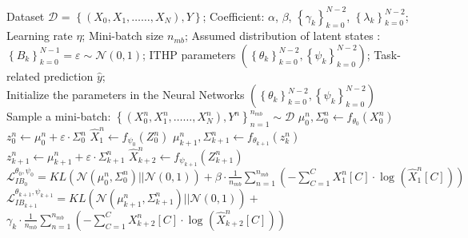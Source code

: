 \begin{algorithm}[htb]
    \caption{Pseudo-code for training ITHP in general scenario }
    \label{alg:algITHP}
    \begin{algorithmic}
      \Require Dataset $\mathcal{D}$ = $\left \{ \left ( X_{0}, X_{1},\dots \dots ,X_{N} \right ) ,Y \right \} $; Coefficient: $\alpha $, $\beta$, $\left \{ \gamma _{k}  \right \} _{k=0}^{N-2} $, $\left \{ \lambda _{k}  \right \} _{k=0}^{N-2} $; Learning rate $\eta$; Mini-batch size $n_{mb}$; Assumed distribution of latent states : $\left \{ B_{k}  \right \} _{k=0}^{N-1} = \varepsilon \sim \mathcal{N} \left ( 0,1 \right )$;
      \Ensure ITHP parameters $(\left \{ \theta _{k}  \right \} _{k=0}^{N-2} ,\left \{ \psi _{k}  \right \} _{k=0}^{N-2} )$; Task-related prediction $\hat{y}$;
      \\Initialize the parameters in the Neural Networks $(\left \{ \theta _{k}  \right \} _{k=0}^{N-2} ,\left \{ \psi _{k}  \right \} _{k=0}^{N-2} )$
    \Repeat
        \State Sample a mini-batch: $\left \{ \left ( X_{0}^{n} , X_{1}^{n},\dots \dots ,X_{N}^{n} \right ) ,Y^{n} \right \} _{n=1}^{n_{mb} }\sim \mathcal{D } $
      \State $\mu_{0}^{n} ,\Sigma_{0}^{n}\longleftarrow f_{\theta _{0} } \left ( X_{0}^{n} \right ) $
      \State $z_{0}^{n} \longleftarrow \mu _{0}^{n}+  \varepsilon \cdot \Sigma  _{0}^{n}$
      \State $\hat{X}_{1}^{n} \longleftarrow f_{\psi _{0}}\left (Z_{0}^{n}\right ) $
        \State $\mu_{k+1}^{n} ,\Sigma_{k+1}^{n}\longleftarrow f_{\theta _{k+1} } \left ( z_{k}^{n} \right ) $
        \State $z_{k+1}^{n} \longleftarrow \mu _{k+1}^{n}+  \varepsilon \cdot \Sigma  _{k+1}^{n}$
        \State $\hat{X}_{k+2}^{n} \longleftarrow f_{\psi _{k+1}}\left (Z_{k+1}^{n}\right ) $
      \EndFor
    \EndFor 
        \State $\mathcal{L} _{IB_{0} }^{\theta _{0},\psi _{0} } =KL\left ( \mathcal{N}\left ( \mu _{0}^{n} ,\Sigma _{0}^{n}  \right )|| \mathcal{N}\left ( 0,1  \right )  \right )+\beta \cdot \frac{1}{n_{mb} }\sum_{n=1}^{n_{mb}}\left ( -\sum_{C=1}^{C}X_{1}^{n} \left [ C \right ] \cdot \log_{}{\left ( \hat{X} _{1}^{n} \left [ C\right ] \right ) }\right )  $
            \State $\mathcal{L} _{IB_{k+1} }^{\theta _{k+1},\psi _{k+1} } =KL\left ( \mathcal{N}\left ( \mu _{k+1}^{n} ,\Sigma _{k+1}^{n}  \right )|| \mathcal{N}\left ( 0,1  \right )  \right )+$ 
            \State$\gamma_{k}  \cdot \frac{1}{n_{mb} }\sum_{n=1}^{n_{mb}}\left ( -\sum_{C=1}^{C}X_{k+2}^{n} \left [ C \right ] \cdot \log_{}{\left ( \hat{X} _{k+2}^{n} \left [ C\right ] \right ) }\right ) $

\end{algorithmic}
\end{algorithm}
